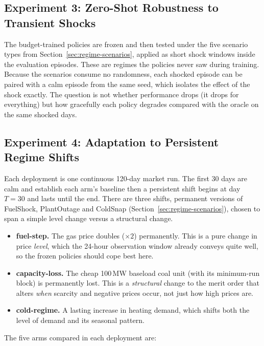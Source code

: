 \documentclass[conference]{IEEEtran}
\begin{document}
\subsection{Experiment 3: Zero-Shot Robustness to Transient Shocks}
\label{sec:setup-robustness}

The budget-trained policies are frozen and then tested under the five scenario types from Section~\ref{sec:regime-scenarios}, applied as short shock windows inside the evaluation episodes. These are regimes the policies never saw during training. Because the scenarios consume no randomness, each shocked episode can be paired with a calm episode from the same seed, which isolates the effect of the shock exactly. The question is not whether performance drops (it drops for everything) but how gracefully each policy degrades compared with the oracle on the same shocked days.

\subsection{Experiment 4: Adaptation to Persistent Regime Shifts}
\label{sec:setup-adaptation}

Each deployment is one continuous 120-day market run. The first 30 days are calm and establish each arm's baseline then a persistent shift begins at day $T=30$ and lasts until the end. There are three shifts, permanent versions of FuelShock, PlantOutage and ColdSnap (Section~\ref{sec:regime-scenarios}), chosen to span a simple level change versus a structural change.

\begin{itemize}
\item \textbf{fuel-step.} The gas price doubles ($\times 2$) permanently. This is a pure change in price \emph{level}, which the 24-hour observation window already conveys quite well, so the frozen policies should cope best here.
\item \textbf{capacity-loss.} The cheap 100\,MW baseload coal unit (with its minimum-run block) is permanently lost. This is a \emph{structural} change to the merit order that alters \emph{when} scarcity and negative prices occur, not just how high prices are.
\item \textbf{cold-regime.} A lasting increase in heating demand, which shifts both the level of demand and its seasonal pattern.
\end{itemize}

The five arms compared in each deployment are:
\end{document}
